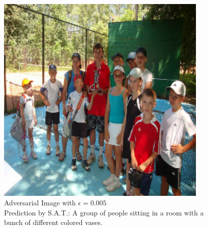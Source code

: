 \begin{figure}[ht]
\begin{minipage}{0.45\textwidth}
        \includegraphics[width=0.9\textwidth]{figures/group_of_people/group_of_people_0.005.png} %
        \caption*{Adversarial Image with $\epsilon=0.005$\\Prediction by S.A.T.: A group of people sitting in a room with a bunch of different colored vases.}
    \end{minipage}
\end{figure}

